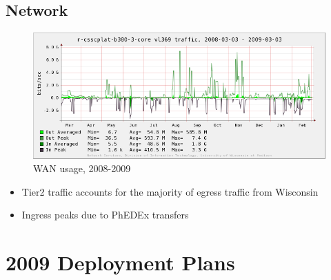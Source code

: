 \documentclass{beamer}
\begin{document}
\subsection{Network}
\begin{frame}
\begin{figure}
    \includegraphics[width=\textwidth]{Graphics/network-1yr.png}
    \caption{WAN usage, 2008-2009}

\end{figure}
\begin{itemize}
    \item Tier2 traffic accounts for the majority of egress traffic from Wisconsin
    \item Ingress peaks due to PhEDEx transfers
\end{itemize}
\end{frame}

\section{2009 Deployment Plans}
\end{document}
